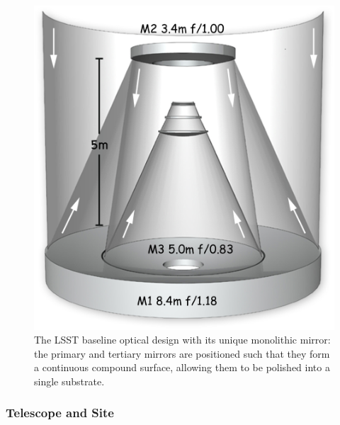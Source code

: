 \documentclass{emulateapj}
\begin{document}
\begin{figure}
\vskip -0.5in
\includegraphics[width=1.0\hsize,clip]{mirrors.ps}
\vskip -0.5in
\caption{The LSST baseline optical design with its unique 
monolithic mirror: the primary and tertiary mirrors are positioned such 
that they form a continuous compound surface, allowing them to be polished 
into a single substrate.}
\label{Fig:optics}
\end{figure}



\subsubsection{ Telescope and Site}
\end{document}
